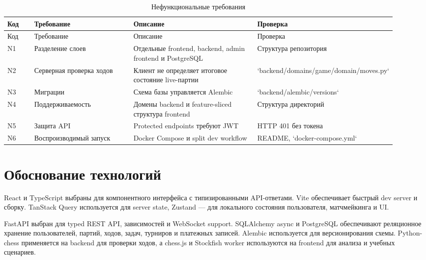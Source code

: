\documentclass[14pt,a4paper]{extreport}
\begin{document}
\begin{center}
\scriptsize
\setlength{\tabcolsep}{4pt}
\renewcommand{\arraystretch}{1.25}
\begin{longtable}{|>{\RaggedRight\arraybackslash}p{0.08\linewidth}|>{\RaggedRight\arraybackslash}p{0.30\linewidth}|>{\RaggedRight\arraybackslash}p{0.42\linewidth}|>{\RaggedRight\arraybackslash}p{0.12\linewidth}|}
\caption{Нефункциональные требования}\label{tab:nonfunctional}\\
\hline
Код & Требование & Описание & Проверка\\ \hline
\endfirsthead
\hline
Код & Требование & Описание & Проверка\\ \hline
\endhead
N1 & Разделение слоев & Отдельные frontend, backend, admin frontend и PostgreSQL & Структура репозитория\\ \hline
N2 & Серверная проверка ходов & Клиент не определяет итоговое состояние live-партии & `backend/domains/game/domain/moves.py`\\ \hline
N3 & Миграции & Схема базы управляется Alembic & `backend/alembic/versions`\\ \hline
N4 & Поддерживаемость & Домены backend и feature-sliced структура frontend & Структура директорий\\ \hline
N5 & Защита API & Protected endpoints требуют JWT & HTTP 401 без токена\\ \hline
N6 & Воспроизводимый запуск & Docker Compose и split dev workflow & README, `docker-compose.yml`\\ \hline
\end{longtable}
\end{center}

\section{Обоснование технологий}

React и TypeScript выбраны для компонентного интерфейса с типизированными API-ответами. Vite обеспечивает быстрый dev server и сборку. TanStack Query используется для server state, Zustand --- для локального состояния пользователя, матчмейкинга и UI.

FastAPI выбран для typed REST API, зависимостей и WebSocket support. SQLAlchemy async и PostgreSQL обеспечивают реляционное хранение пользователей, партий, ходов, задач, турниров и платежных записей. Alembic используется для версионирования схемы. Python-chess применяется на backend для проверки ходов, а chess.js и Stockfish worker используются на frontend для анализа и учебных сценариев.
\end{document}
